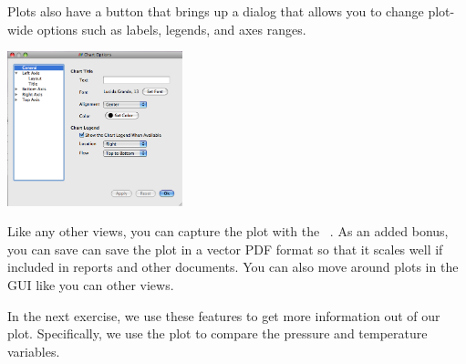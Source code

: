 Plots also have a  button that brings up a dialog that
allows you to change plot-wide options such as labels, legends, and axes
ranges.
\begin{inlinefig}
  \includegraphics[width=2in]{images/PlotViewOptions}
\end{inlinefig}

Like any other views, you can capture the plot with the  \ra
{}~.  As an added bonus, you
can save can save the plot in a vector PDF format so that it scales well if
included in reports and other documents.  You can also move around plots in
the GUI like you can other views.

In the next exercise, we use these features to get more information out of
our plot.  Specifically, we use the plot to compare the pressure and
temperature variables.

